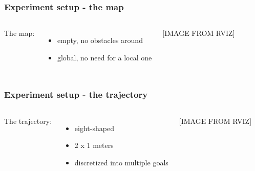 \documentclass{beamer}
\begin{document}
\begin{frame}
\frametitle{Experiment setup - the map}

\begin{columns}


The map:
\begin{itemize}
  \item empty, no obstacles around
  \item global, no need for a local one
\end{itemize}



[IMAGE FROM RVIZ]

\end{columns}

\end{frame}


\begin{frame}
\frametitle{Experiment setup - the trajectory}

\begin{columns}


The trajectory:
\begin{itemize}
  \item eight-shaped
  \item 2 x 1 meters
  \item discretized into multiple goals
\end{itemize}



[IMAGE FROM RVIZ]

\end{columns}

\end{frame}

\end{document}
